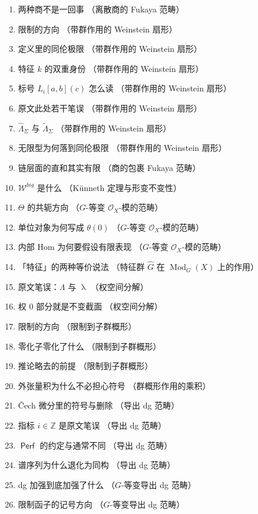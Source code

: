 \documentclass[11pt,a4paper]{article}
\DeclareMathOperator{\Mod}{\mathrm{Mod}}
\DeclareMathOperator{\Perf}{\mathsf{Perf}}
\DeclareMathOperator{\cha}{\lambda}
\theoremstyle{cnth}
\begin{document}
\begin{enumerate}[label={译注 \arabic*：},leftmargin=2.8cm,itemsep=1pt]
\item 两种商不是一回事 \quad（离散商的 Fukaya 范畴）
\item 限制的方向 \quad（带群作用的 Weinstein 扇形）
\item 定义里的同伦极限 \quad（带群作用的 Weinstein 扇形）
\item 特征 $k$ 的双重身份 \quad（带群作用的 Weinstein 扇形）
\item 标号 $L_i[a,b](c)$ 怎么读 \quad（带群作用的 Weinstein 扇形）
\item 原文此处若干笔误 \quad（带群作用的 Weinstein 扇形）
\item $\widehat{\Lambda}_{\Sigma}$ 与 $\widetilde{\Lambda}_{\Sigma}$ \quad（带群作用的 Weinstein 扇形）
\item 无限型为何落到同伦极限 \quad（带群作用的 Weinstein 扇形）
\item 链层面的直和其实有限 \quad（商的包裹 Fukaya 范畴）
\item $\mathcal{W}^{big}$ 是什么 \quad（K\"unneth 定理与形变不变性）
\item $\Theta$ 的共轭方向 \quad（$G$-等变 $\mathcal{O}_X$-模的范畴）
\item 单位对象为何写成 $\theta(0)$ \quad（$G$-等变 $\mathcal{O}_X$-模的范畴）
\item 内部 Hom 为何要假设有限表现 \quad（$G$-等变 $\mathcal{O}_X$-模的范畴）
\item 「特征」的两种等价说法 \quad（特征群 $\widehat{G}$ 在 $\Mod_G(X)$ 上的作用）
\item 原文笔误：$\Lambda$ 与 $\cha$ \quad（权空间分解）
\item 权 $0$ 部分就是不变截面 \quad（权空间分解）
\item 限制的方向 \quad（限制到子群概形）
\item 零化子零化了什么 \quad（限制到子群概形）
\item 推论略去的前提 \quad（限制到子群概形）
\item 外张量积为什么不必担心符号 \quad（群概形作用的乘积）
\item Čech 微分里的符号与删除 \quad（导出 dg 范畴）
\item 指标 $i\in\mathbb{Z}$ 是原文笔误 \quad（导出 dg 范畴）
\item $\Perf$ 的约定与通常不同 \quad（导出 dg 范畴）
\item 谱序列为什么退化为同构 \quad（导出 dg 范畴）
\item dg 加强到底加强了什么 \quad（$G$-等变导出 dg 范畴）
\item 限制函子的记号方向 \quad（$G$-等变导出 dg 范畴）

\end{enumerate}
\end{document}
